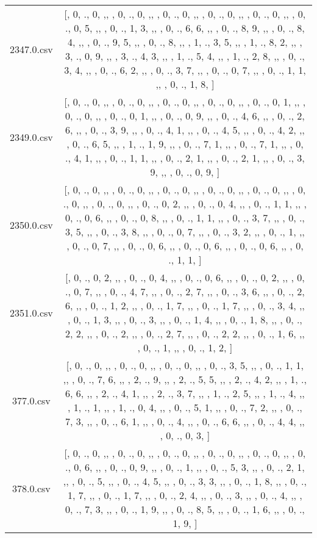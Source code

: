 \begin{table}[ht]
\begin{tabular}{@{}c c@{}}
	2347.0.csv & [, 0, ., 0, ,,  , 0, ., 0, ,,  , 0, ., 0, ,,  , 0, ., 0, ,,  , 0, ., 0, ,,  , 0, ., 0, 5, ,,  , 0, ., 1, 3, ,,  , 0, ., 6, 6, ,,  , 0, ., 8, 9, ,,  , 0, ., 8, 4, ,,  , 0, ., 9, 5, ,,  , 0, ., 8, ,,  , 1, ., 3, 5, ,,  , 1, ., 8, 2, ,,  , 3, ., 0, 9, ,,  , 3, ., 4, 3, ,,  , 1, ., 5, 4, ,,  , 1, ., 2, 8, ,,  , 0, ., 3, 4, ,,  , 0, ., 6, 2, ,,  , 0, ., 3, 7, ,,  , 0, ., 0, 7, ,,  , 0, ., 1, 1, ,,  , 0, ., 1, 8, ]\\ 
	2349.0.csv & [, 0, ., 0, ,,  , 0, ., 0, ,,  , 0, ., 0, ,,  , 0, ., 0, ,,  , 0, ., 0, 1, ,,  , 0, ., 0, ,,  , 0, ., 0, 1, ,,  , 0, ., 0, 9, ,,  , 0, ., 4, 6, ,,  , 0, ., 2, 6, ,,  , 0, ., 3, 9, ,,  , 0, ., 4, 1, ,,  , 0, ., 4, 5, ,,  , 0, ., 4, 2, ,,  , 0, ., 6, 5, ,,  , 1, ., 1, 9, ,,  , 0, ., 7, 1, ,,  , 0, ., 7, 1, ,,  , 0, ., 4, 1, ,,  , 0, ., 1, 1, ,,  , 0, ., 2, 1, ,,  , 0, ., 2, 1, ,,  , 0, ., 3, 9, ,,  , 0, ., 0, 9, ]\\ 
	2350.0.csv & [, 0, ., 0, ,,  , 0, ., 0, ,,  , 0, ., 0, ,,  , 0, ., 0, ,,  , 0, ., 0, ,,  , 0, ., 0, ,,  , 0, ., 0, ,,  , 0, ., 0, 2, ,,  , 0, ., 0, 4, ,,  , 0, ., 1, 1, ,,  , 0, ., 0, 6, ,,  , 0, ., 0, 8, ,,  , 0, ., 1, 1, ,,  , 0, ., 3, 7, ,,  , 0, ., 3, 5, ,,  , 0, ., 3, 8, ,,  , 0, ., 0, 7, ,,  , 0, ., 3, 2, ,,  , 0, ., 1, ,,  , 0, ., 0, 7, ,,  , 0, ., 0, 6, ,,  , 0, ., 0, 6, ,,  , 0, ., 0, 6, ,,  , 0, ., 1, 1, ]\\ 
	2351.0.csv & [, 0, ., 0, 2, ,,  , 0, ., 0, 4, ,,  , 0, ., 0, 6, ,,  , 0, ., 0, 2, ,,  , 0, ., 0, 7, ,,  , 0, ., 4, 7, ,,  , 0, ., 2, 7, ,,  , 0, ., 3, 6, ,,  , 0, ., 2, 6, ,,  , 0, ., 1, 2, ,,  , 0, ., 1, 7, ,,  , 0, ., 1, 7, ,,  , 0, ., 3, 4, ,,  , 0, ., 1, 3, ,,  , 0, ., 3, ,,  , 0, ., 1, 4, ,,  , 0, ., 1, 8, ,,  , 0, ., 2, 2, ,,  , 0, ., 2, ,,  , 0, ., 2, 7, ,,  , 0, ., 2, 2, ,,  , 0, ., 1, 6, ,,  , 0, ., 1, ,,  , 0, ., 1, 2, ]\\ 
	377.0.csv & [, 0, ., 0, ,,  , 0, ., 0, ,,  , 0, ., 0, ,,  , 0, ., 3, 5, ,,  , 0, ., 1, 1, ,,  , 0, ., 7, 6, ,,  , 2, ., 9, ,,  , 2, ., 5, 5, ,,  , 2, ., 4, 2, ,,  , 1, ., 6, 6, ,,  , 2, ., 4, 1, ,,  , 2, ., 3, 7, ,,  , 1, ., 2, 5, ,,  , 1, ., 4, ,,  , 1, ., 1, ,,  , 1, ., 0, 4, ,,  , 0, ., 5, 1, ,,  , 0, ., 7, 2, ,,  , 0, ., 7, 3, ,,  , 0, ., 6, 1, ,,  , 0, ., 4, ,,  , 0, ., 6, 6, ,,  , 0, ., 4, 4, ,,  , 0, ., 0, 3, ]\\ 
	378.0.csv & [, 0, ., 0, ,,  , 0, ., 0, ,,  , 0, ., 0, ,,  , 0, ., 0, ,,  , 0, ., 0, ,,  , 0, ., 0, 6, ,,  , 0, ., 0, 9, ,,  , 0, ., 1, ,,  , 0, ., 5, 3, ,,  , 0, ., 2, 1, ,,  , 0, ., 5, ,,  , 0, ., 4, 5, ,,  , 0, ., 3, 3, ,,  , 0, ., 1, 8, ,,  , 0, ., 1, 7, ,,  , 0, ., 1, 7, ,,  , 0, ., 2, 4, ,,  , 0, ., 3, ,,  , 0, ., 4, ,,  , 0, ., 7, 3, ,,  , 0, ., 1, 9, ,,  , 0, ., 8, 5, ,,  , 0, ., 1, 6, ,,  , 0, ., 1, 9, ]\\ 

\end{tabular}
\end{table}
